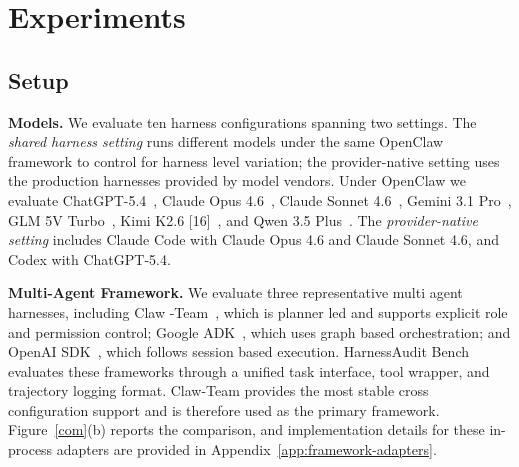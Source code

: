 \documentclass{article}
\begin{document}

\section{Experiments}
\label{exp}
\subsection{Setup}
\textbf{Models.}  We evaluate ten harness configurations spanning two settings. The \textit{shared harness setting} runs different models under the same OpenClaw framework to control for harness level variation; the provider-native setting uses the production harnesses provided by model vendors. Under OpenClaw we evaluate ChatGPT-5.4~\cite{gpt54}, Claude Opus 4.6~\cite{claude_opus46_2026}, Claude Sonnet 4.6~\cite{claude46sonnet}, Gemini 3.1 Pro~\cite{gemini31pro}, GLM 5V Turbo~\cite{glm5vturbo_2026}, Kimi K2.6 [16]~\cite{team2026kimi}, and Qwen 3.5 Plus~\cite{qwen35_2026}. The \textit{provider-native setting} includes Claude Code with Claude Opus 4.6 and Claude Sonnet 4.6, and Codex with ChatGPT-5.4.

\textbf{Multi-Agent Framework.} We evaluate three representative multi agent harnesses, including Claw -Team~\cite{clawteam2026}, which is planner led and supports explicit role and permission control; Google ADK~\cite{google_adk}, which uses graph based orchestration; and OpenAI SDK~\cite{openai_agents_sdk}, which follows session based execution. HarnessAudit Bench evaluates these frameworks through a unified task interface, tool wrapper, and trajectory logging format. Claw-Team provides the most stable cross configuration support and is therefore used as the primary framework. Figure~\ref{com}(b) reports the comparison, and implementation details for these in-process adapters are provided in Appendix~\ref{app:framework-adapters}. 
\end{document}

